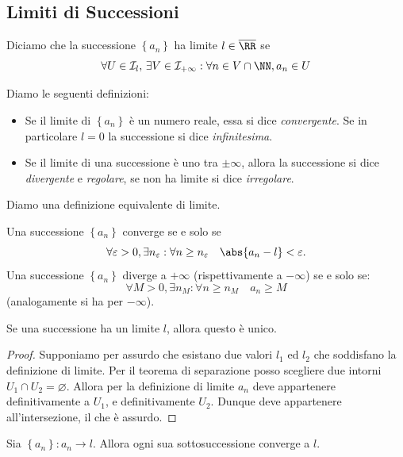 \documentclass[11pt]{scrartcl}
\newcommand{\eset}{\varnothing}
\begin{document}
	\subsection{Limiti di Successioni}
	\begin{definition}[Limite]
		Diciamo che la successione $\left\{a_n\right\}$ ha limite $l\in\overline{\RR}$ se
		$$\forall U\in\mathcal{I}_l,\,\exists V\in \mathcal{I}_{+\infty}:\forall n\in V\cap \NN,a_n\in U$$
	\end{definition}
	\begin{definition}
		Diamo le seguenti definizioni:
		\begin{itemize}
			\item Se il limite di $\left\{a_n\right\}$ è un numero reale, essa si dice \textit{convergente}. Se in particolare $l=0$ la successione si dice \textit{infinitesima}.
			\item Se il limite di una successione è uno tra $\pm\infty$, allora la successione si dice \textit{divergente} e \textit{regolare}, se non ha limite si dice \textit{irregolare}.
		\end{itemize}
	\end{definition}
	Diamo una definizione equivalente di limite.
	\begin{proposition}
		Una successione $\left\{a_n\right\}$ converge se e solo se
		$$\forall\varepsilon>0,\exists n_\varepsilon:\forall n \ge n_\varepsilon \quad \abs{a_n-l}<\varepsilon.$$
		Una successione $\left\{a_n\right\}$ diverge a $+\infty$ (rispettivamente a $-\infty$) se e solo se:
		$$\forall M>0,\exists n_M:\forall n\ge n_M \quad a_n\ge M$$
		(analogamente si ha per $-\infty$).
	\end{proposition}
	\begin{theorem}
		Se una successione ha un limite $l$, allora questo è unico.
	\end{theorem}
	\begin{proof}
		Supponiamo per assurdo che esistano due valori $l_1$ ed $l_2$ che soddisfano la definizione di limite. Per il teorema di separazione posso scegliere due intorni $U_1\cap U_2=\eset$. Allora per la definizione di limite $a_n$ deve appartenere definitivamente a $U_1$, e definitivamente  $U_2$. Dunque deve appartenere all'intersezione, il che è assurdo.
	\end{proof}
	\begin{proposition}\label{succ converg implica sottosucc converg}
		Sia $\left\{a_n\right\}:a_n\to l$. Allora ogni sua sottosuccessione converge a $l$.
	\end{proposition}
\end{document}
